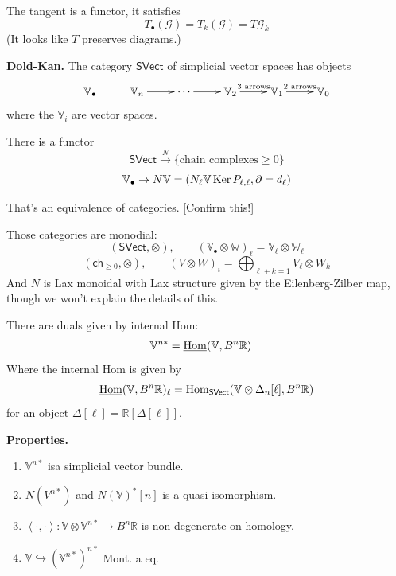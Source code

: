 \medskip\noindent
The tangent is a functor, it satisfies
$$
T_\bullet(\mathcal{G})=T_k(\mathcal{G})=
T\mathcal{G}_k
$$
(It looks like $T$ preserves diagrams.)

\medskip\noindent
{\bf Dold-Kan.} The category $\mathsf{SVect}$
of simplicial vector spaces
has objects
$$
\xymatrix{
\mathbb{V}_\bullet&
\mathbb{V}_n\ar[r]&\cdots
\ar[r]&\mathbb{V}_2\ar[r]^{\text{3 arrows}}&
\mathbb{V}_1\ar[r]^{\text{2
arrows}}&\mathbb{V}_0
}
$$
where the $\mathbb{V}_i$ are vector spaces.

There is a functor
$$
\mathsf{SVect}\overset{N}{\to}\{\text{chain
complexes}\geq 0\}
$$
$$
\mathbb{V}_{\bullet}\to N\mathbb{V}=
\left(N_\ell \mathbb{V}\mathop{\mathrm{Ker}}
P_{\ell,\ell},\partial=d_\ell\right)
$$

\begin{theorem}
\label{theorem-Dold-Kan}
That's an equivalence of categories. [Confirm
this!]
\end{theorem}

Those categories are monodial:
$$
(\mathsf{SVect},\otimes),\qquad
(\mathbb{V}_\bullet \otimes \mathbb{W})_\ell
=\mathbb{V}_\ell \otimes \mathbb{W}_\ell
$$
$$
(\mathsf{ch}_{\geq 0},\otimes),\qquad (V
\otimes W)_i=
\bigoplus_{\ell +k=1}V_\ell \otimes W_k
$$
And $N$ is Lax monoidal with Lax structure
given by the
Eilenberg-Zilber map, though we won't explain
the details of this.

There are duals given by internal Hom:
$$
\begin{aligned}
\mathbb{V}^{n*}&=\underline{\mathop{\mathrm{Hom}}\nolimits}(\mathbb{V},
B^n\mathbb{R})
\end{aligned}
$$
Where the internal Hom is given by
$$
\underline{\mathop{\mathrm{Hom}}\nolimits}(\mathbb{V},B^n\mathbb{R})
_\ell
=\mathop{\mathrm{Hom}}\nolimits_{\mathsf{SVect}}(\mathbb{V}
\otimes\Delta_n[\ell],B^n\mathbb{R})
$$
for an object
$\Delta[\ell]=\mathbb{R}[\Delta[\ell]]$.


\medskip\noindent
{\bf Properties.}
\begin{enumerate}
\item $\mathbb{V}^{n*}$ isa simplicial vector
bundle.
\item $N(V^{n*})$ and $N(\mathbb{V})^*[n]$ is
a quasi isomorphism.
\item
$\left\langle{}\cdot,\cdot\right\rangle{}:\mathbb{V}\otimes
\mathbb{V}^{n*}\to
B^n\mathbb{R}$ is non-degenerate on homology.
\item $\mathbb{V}\hookrightarrow
(\mathbb{V}^{n*})^{n*}$
Mont. a eq.
\end{enumerate}

